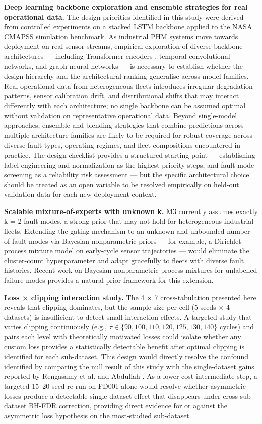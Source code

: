\documentclass[review,12pt]{elsarticle}
\begin{document}
\textbf{Deep learning backbone exploration and ensemble strategies for real operational data.} The design priorities identified in this study were derived from controlled experiments on a stacked LSTM backbone applied to the NASA CMAPSS simulation benchmark. As industrial PHM systems move towards deployment on real sensor streams, empirical exploration of diverse backbone architectures — including Transformer encoders \cite{ref08,ref11,ref13,ref14}, temporal convolutional networks, and graph neural networks — is necessary to establish whether the design hierarchy and the architectural ranking generalise across model families. Real operational data from heterogeneous fleets introduces irregular degradation patterns, sensor calibration drift, and distributional shifts that may interact differently with each architecture; no single backbone can be assumed optimal without validation on representative operational data. Beyond single-model approaches, ensemble and blending strategies that combine predictions across multiple architecture families are likely to be required for robust coverage across diverse fault types, operating regimes, and fleet compositions encountered in practice. The design checklist provides a structured starting point — establishing label engineering and normalization as the highest-priority steps, and fault-mode screening as a reliability risk assessment — but the specific architectural choice should be treated as an open variable to be resolved empirically on held-out validation data for each new deployment context.

\textbf{Scalable mixture-of-experts with unknown k.} M3 currently assumes exactly k = 2 fault modes, a strong prior that may not hold for heterogeneous industrial fleets. Extending the gating mechanism to an unknown and unbounded number of fault modes via Bayesian nonparametric priors — for example, a Dirichlet process mixture model on early-cycle sensor trajectories \cite{ref34} — would eliminate the cluster-count hyperparameter and adapt gracefully to fleets with diverse fault histories. Recent work on Bayesian nonparametric process mixtures for unlabelled failure modes \cite{ref34} provides a natural prior framework for this extension.

\textbf{Loss × clipping interaction study.} The 4 × 7 cross-tabulation presented here reveals that clipping dominates, but the sample size per cell (5 seeds × 4 datasets) is insufficient to detect small interaction effects. A targeted study that varies clipping continuously (e.g., $\tau \in \{90, 100, 110, 120, 125, 130, 140\}$ cycles) and pairs each level with theoretically motivated losses could isolate whether any custom loss provides a statistically detectable benefit after optimal clipping is identified for each sub-dataset. This design would directly resolve the confound identified by comparing the null result of this study with the single-dataset gains reported by Rengasamy et al. \cite{ref37} and Abdullah \cite{ref22}. As a lower-cost intermediate step, a targeted 15--20 seed re-run on FD001 alone would resolve whether asymmetric losses produce a detectable single-dataset effect that disappears under cross-sub-dataset BH-FDR correction, providing direct evidence for or against the asymmetric loss hypothesis on the most-studied sub-dataset.
\end{document}
